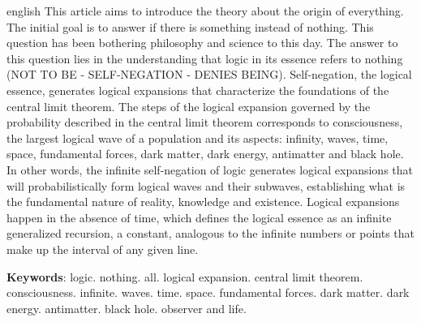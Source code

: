 \vspace{-5mm}
\renewcommand{\resumoname}{Abstract}
\begin{resumoumacoluna}
 \begin{otherlanguage*}{english}
	\vspace{-2mm}
	This article aims to introduce the theory about the origin of everything. The initial goal is to answer if there is something instead of nothing. This question has been bothering philosophy and science to this day. The answer to this question lies in the understanding that logic in its essence refers to nothing (NOT TO BE - SELF-NEGATION - DENIES BEING). Self-negation, the logical essence, generates logical expansions that characterize the foundations of the central limit theorem. The steps of the logical expansion governed by the probability described in the central limit theorem corresponds to consciousness, the largest logical wave of a population and its aspects: infinity, waves, time, space, fundamental forces, dark matter, dark energy, antimatter and black hole. In other words, the infinite self-negation of logic generates logical expansions that will probabilistically form logical waves and their subwaves, establishing what is the fundamental nature of reality, knowledge and existence. Logical expansions happen in the absence of time, which defines the logical essence as an infinite generalized recursion, a constant, analogous to the infinite numbers or points that make up the interval of any given line.
	
	\noindent
	\textbf{Keywords}: logic. nothing. all. logical expansion. central limit theorem. consciousness. infinite. waves. time. space. fundamental forces. dark matter. dark energy. antimatter. black hole. observer and life.
 \end{otherlanguage*}  
\end{resumoumacoluna}
